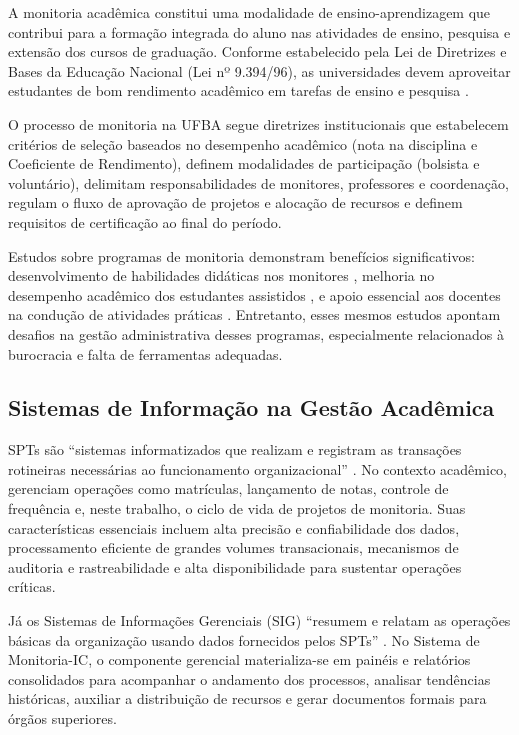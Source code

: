 \documentclass[portuguese]{sbc2025}%
\begin{document}
A monitoria acadêmica constitui uma modalidade de ensino-aprendizagem que contribui para a formação integrada do aluno nas atividades de ensino, pesquisa e extensão dos cursos de graduação. Conforme estabelecido pela Lei de Diretrizes e Bases da Educação Nacional (Lei nº 9.394/96), as universidades devem aproveitar estudantes de bom rendimento acadêmico em tarefas de ensino e pesquisa \cite{Brasil1996}.

O processo de monitoria na UFBA segue diretrizes institucionais que estabelecem critérios de seleção baseados no desempenho acadêmico (nota na disciplina e Coeficiente de Rendimento), definem modalidades de participação (bolsista e voluntário), delimitam responsabilidades de monitores, professores e coordenação, regulam o fluxo de aprovação de projetos e alocação de recursos e definem requisitos de certificação ao final do período.

Estudos sobre programas de monitoria demonstram benefícios significativos: desenvolvimento de habilidades didáticas nos monitores \cite{Natario2010}, melhoria no desempenho acadêmico dos estudantes assistidos \cite{Frison2016}, e apoio essencial aos docentes na condução de atividades práticas \cite{Dantas2014}. Entretanto, esses mesmos estudos apontam desafios na gestão administrativa desses programas, especialmente relacionados à burocracia e falta de ferramentas adequadas.

\subsection{Sistemas de Informação na Gestão Acadêmica}

SPTs são “sistemas informatizados que realizam e registram as transações rotineiras necessárias ao funcionamento organizacional” \cite{Laudon_Laudon_2011}. No contexto acadêmico, gerenciam operações como matrículas, lançamento de notas, controle de frequência e, neste trabalho, o ciclo de vida de projetos de monitoria. Suas características essenciais incluem alta precisão e confiabilidade dos dados, processamento eficiente de grandes volumes transacionais, mecanismos de auditoria e rastreabilidade e alta disponibilidade para sustentar operações críticas.

Já os Sistemas de Informações Gerenciais (SIG) “resumem e relatam as operações básicas da organização usando dados fornecidos pelos SPTs” \cite{Laudon_Laudon_2011}. No Sistema de Monitoria-IC, o componente gerencial materializa-se em painéis e relatórios consolidados para acompanhar o andamento dos processos, analisar tendências históricas, auxiliar a distribuição de recursos e gerar documentos formais para órgãos superiores.
\end{document}
